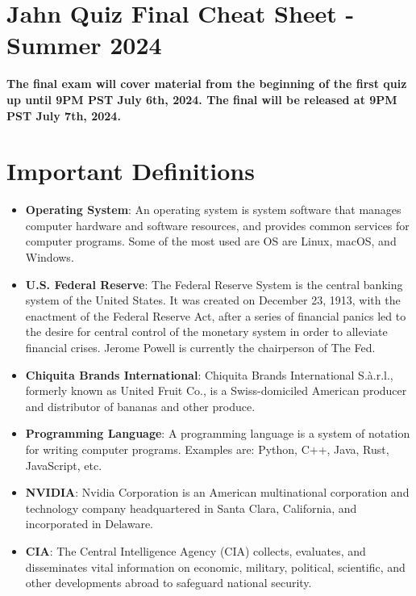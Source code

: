 \documentclass[10pt]{article}
\begin{document}
\section*{Jahn Quiz Final Cheat Sheet - Summer 2024}
\textbf{The final exam will cover material from the beginning of the first quiz up until 9PM PST July 6th, 2024. The final will be released at 9PM PST July 7th, 2024.}

\section*{Important Definitions}
\begin{multicols}{2}
\begin{itemize}
    
    \item \textbf{Operating System}: An operating system is system software that manages computer hardware and software resources, and provides common services for computer programs. Some of the most used are OS are Linux, macOS, and Windows.
    
    \item \textbf{U.S. Federal Reserve}: The Federal Reserve System is the central banking system of the United States. It was created on December 23, 1913, with the enactment of the Federal Reserve Act, after a series of financial panics led to the desire for central control of the monetary system in order to alleviate financial crises. Jerome Powell is currently the chairperson of The Fed.
    
    \item \textbf{Chiquita Brands International}: Chiquita Brands International S.à.r.l., formerly known as United Fruit Co., is a Swiss-domiciled American producer and distributor of bananas and other produce.
    
    \item \textbf{Programming Language}: A programming language is a system of notation for writing computer programs. Examples are: Python, C++, Java, Rust, JavaScript, etc.
    
     \item \textbf{NVIDIA}: Nvidia Corporation is an American multinational corporation and technology company headquartered in Santa Clara, California, and incorporated in Delaware. 
    
    \item \textbf{CIA}: The Central Intelligence Agency (CIA) collects, evaluates, and disseminates vital information on economic, military, political, scientific, and other developments abroad to safeguard national security.
    

\end{itemize}
\end{multicols}
\end{document}

